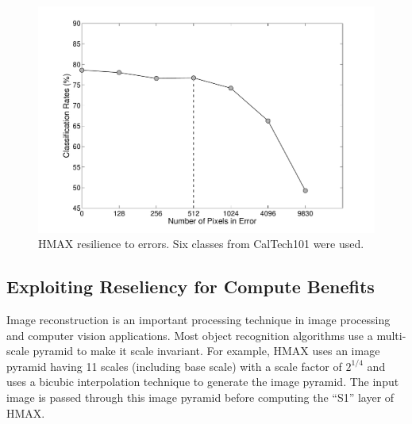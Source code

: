 \begin{figure}[htb!]
\vspace{0pt}
\centering
\includegraphics[width=0.99\linewidth,trim={20 20 30 20}, clip]{./figures/PixelSensitivityAnalysis.pdf}
\vspace{0pt}
\caption{HMAX resilience to errors. Six classes from CalTech101 were used.}\label{fig:hmax_pixel_sensitivity}
\vspace{0pt}
\end{figure}

\subsection{Exploiting Reseliency for Compute Benefits}
Image reconstruction is an important processing technique in image processing and computer vision applications. Most object recognition algorithms use a multi-scale 
pyramid to make it scale invariant. For example, HMAX uses an image pyramid having 11 scales (including base scale) with a scale factor of $2^{1/4}$ and 
uses a bicubic interpolation technique 
to generate the image pyramid. The input image is passed through this image pyramid before computing the ``S1'' layer of HMAX. 


